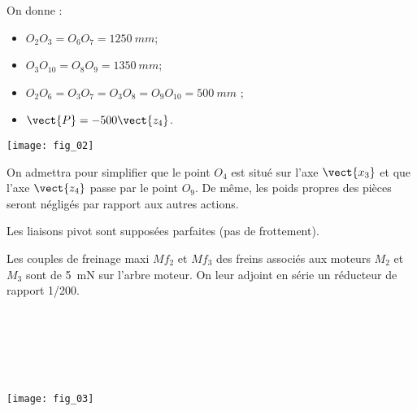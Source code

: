 On donne :
\begin{itemize}
\item $O_2O_3 = O_6O_7 = \SI{1250}{mm}$; 
\item $O_3O_{10} = O_8O_9 = \SI{1350}{mm}$; 
\item $O_2O_6 = O_3O_7 = O_3O_8 = O_9O_{10} = \SI{500}{mm}$ ; 
\item $\vect{P} = -500\vect{z_4}$.
\end{itemize}


\begin{marginfigure}
\texttt{[image: fig\_02]}
\end{marginfigure}

On admettra pour simplifier que le point $O_4$ est situé sur l’axe  $\vect{x_3}$ et que l’axe $\vect{z_4}$ passe par le 
point  $O_9$.  De  même,  les  poids  propres  des  pièces  seront  négligés  par  rapport  aux  autres 
actions. 

Les liaisons pivot sont supposées parfaites (pas de frottement). 

Les  couples de  freinage maxi $Mf_2$ et $Mf_3$ des  freins  associés  aux moteurs $M_2$ et $M_3$ sont de 
\SI{5}{mN} sur l’arbre moteur. On leur adjoint en série un réducteur de rapport 1/200. 



\ifprof
\begin{corrige}~\\

\end{corrige}
\else
\fi


\ifprof
\begin{corrige}~\\

\end{corrige}
\else
\fi

\ifprof
\begin{corrige}~\\

\end{corrige}
\else
\fi

\begin{center}
\texttt{[image: fig\_03]}
\end{center}


